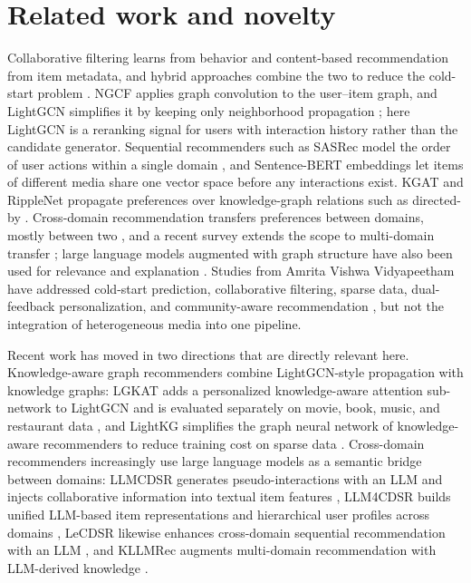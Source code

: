 \documentclass[3p,times,procedia]{elsarticle}
\begin{document}
\section{Related work and novelty}
\label{sec:discussion}
Collaborative filtering learns from behavior and content-based recommendation from item metadata, and hybrid approaches combine the two to reduce the cold-start problem \cite{zhang2019deep}. NGCF applies graph convolution to the user--item graph, and LightGCN simplifies it by keeping only neighborhood propagation \cite{wang2019ngcf,he2020lightgcn}; here LightGCN is a reranking signal for users with interaction history rather than the candidate generator. Sequential recommenders such as SASRec model the order of user actions within a single domain \cite{kang2018sasrec}, and Sentence-BERT embeddings \cite{reimers2019sbert} let items of different media share one vector space before any interactions exist. KGAT and RippleNet propagate preferences over knowledge-graph relations such as directed-by \cite{wang2019kgat,wang2018ripplenet}. Cross-domain recommendation transfers preferences between domains, mostly between two \cite{zang2022cross}, and a recent survey extends the scope to multi-domain transfer \cite{zhang2025survey}; large language models augmented with graph structure have also been used for relevance and explanation \cite{wu2024llmrec}. Studies from Amrita Vishwa Vidyapeetham have addressed cold-start prediction, collaborative filtering, sparse data, dual-feedback personalization, and community-aware recommendation \cite{amrita2023densenet,amrita2023adamvrgo,amrita2024sparse,amrita2025dualfeedback,amrita2026svd}, but not the integration of heterogeneous media into one pipeline.

Recent work has moved in two directions that are directly relevant here. Knowledge-aware graph recommenders combine LightGCN-style propagation with knowledge graphs: LGKAT adds a personalized knowledge-aware attention sub-network to LightGCN and is evaluated separately on movie, book, music, and restaurant data \cite{hassanzadeh2025lgkat}, and LightKG simplifies the graph neural network of knowledge-aware recommenders to reduce training cost on sparse data \cite{li2025lightkg}. Cross-domain recommenders increasingly use large language models as a semantic bridge between domains: LLMCDSR generates pseudo-interactions with an LLM and injects collaborative information into textual item features \cite{xin2025llmcdsr}, LLM4CDSR builds unified LLM-based item representations and hierarchical user profiles across domains \cite{liu2025llm4cdsr}, LeCDSR likewise enhances cross-domain sequential recommendation with an LLM \cite{wang2026lecdsr}, and KLLMRec augments multi-domain recommendation with LLM-derived knowledge \cite{li2026kllmrec}.
\end{document}
